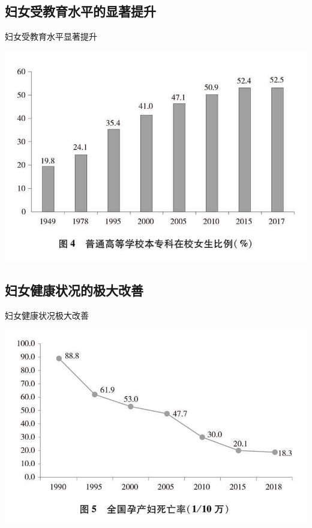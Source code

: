 \subsection{妇女受教育水平的显著提升}
\begin{frame}{妇女受教育水平显著提升}
    \begin{center}
        \includegraphics[width=.8\textwidth]{../docs/img/2-5.jpg}
    \end{center}
\end{frame}



\subsection{妇女健康状况的极大改善}
\begin{frame}{妇女健康状况极大改善}
    \begin{center}
        \includegraphics[width=.8\textwidth]{../docs/img/2-6.jpg}
    \end{center}
\end{frame}



